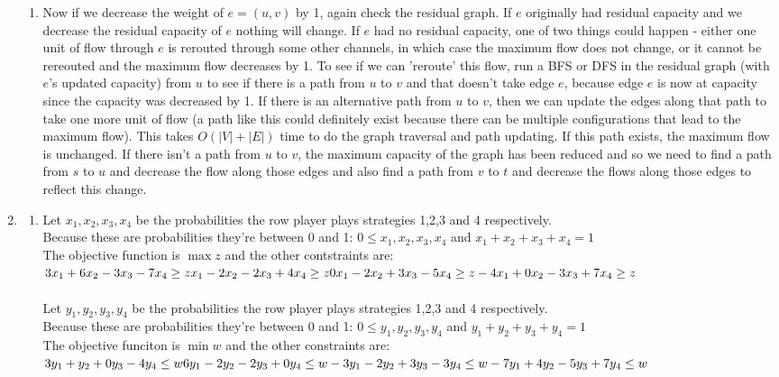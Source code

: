 \documentclass{article}
\begin{document}
\begin{enumerate}
\begin{enumerate}
		\item Now if we decrease the weight of $e = (u,v)$ by 1, again check the residual graph.  If $e$ originally had residual capacity and we decrease the residual capacity of $e$ nothing will change.  If $e$ had no residual capacity, one of two things could happen - either one unit of flow through $e$ is rerouted through some other channels, in which case the maximum flow does not change, or it cannot be rereouted and the maximum flow decreases by 1.  To see if we can 'reroute' this flow, run a BFS or DFS in the residual graph (with $e$'s updated capacity) from $u$ to see if there is a path from $u$ to $v$ and that doesn't take edge $e$, because edge $e$ is now at capacity since the capacity was decreased by 1.  If there is an alternative path from $u$ to $v$, then we can update the edges along that path to take one more unit of flow (a path like this could definitely exist because there can be multiple configurations that lead to the maximum flow).  This takes $O(|V|+|E|)$ time to do the graph traversal and path updating. If this path exists, the maximum flow is unchanged. If there isn't a path from $u$ to $v$, the maximum capacity of the graph has been reduced and so we need to find a path from $s$ to $u$ and decrease the flow along those edges and also find a path from $v$ to $t$ and decrease the flows along those edges to reflect this change.  
	\end{enumerate}
	
	\item 
	\begin{enumerate}
		\item Let $x_1, x_2, x_3, x_4$ be the probabilities the row player plays strategies 1,2,3 and 4 respectively.  \\
		Because these are probabilities they're between 0 and 1: $0\leq x_1, x_2, x_3, x_4$ and $x_1 + x_2 + x_3 + x_4 = 1$ \\
		The objective function is $\displaystyle\max z$ and the other contstraints are: \\
		$3x_1+6x_2-3x_3-7x_4 \geq z \\
		x_1-2x_2-2x_3+4x_4 \geq z \\
		0x_1-2x_2+3x_3-5x_4 \geq z \\
		-4x_1+0x_2-3x_3+7x_4 \geq z \\
		$
		\\\\
		Let $y_1, y_2, y_3, y_4$ be the probabilities the row player plays strategies 1,2,3 and 4 respectively.  \\
		Because these are probabilities they're between 0 and 1: $0\leq y_1, y_2, y_3, y_4$ and $y_1 + y_2 + y_3 + y_4 = 1$ \\ 
		The objective funciton is $\displaystyle\min w$ and the other constraints are: \\
		$3y_1+y_2+0y_3-4y_4 \leq w \\
		6y_1-2y_2-2y_3+0y_4 \leq w \\
		-3y_1-2y_2+3y_3-3y_4 \leq w \\
		-7y_1+4y_2-5y_3+7y_4 \leq w \\
		$
		

\end{enumerate}
\end{enumerate}
\end{document}
